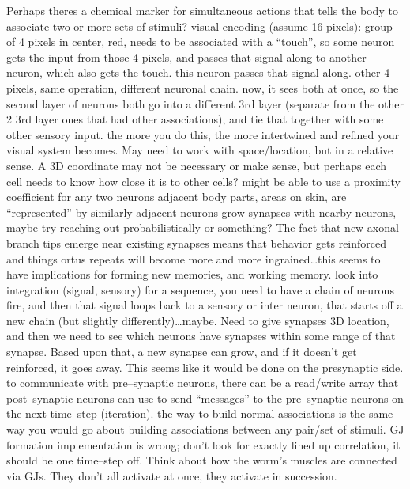 \documentclass[11pt, a4paper, oneside]{article}   	%
\begin{document}
\begin{outline}
  \point Perhaps theres a chemical marker for simultaneous actions that tells the body to associate two or more sets of stimuli?
  \point visual encoding (assume 16 pixels):
    \subpoint group of 4 pixels in center, red, needs to be associated with a ``touch'', so some neuron gets the input from those 4 pixels, and passes that signal along to another neuron, which also gets the touch. this neuron passes that signal along.
    \subpoint other 4 pixels, same operation, different neuronal chain.
    \subpoint now, it sees both at once, so the second layer of neurons both go into a different 3rd layer (separate from the other 2 3rd layer ones that had other associations), and tie that together with some other sensory input.
    \subpoint the more you do this, the more intertwined and refined your visual system becomes.
\point May need to work with space/location, but in a relative sense. A 3D coordinate may not be necessary or make sense, but perhaps each cell needs to know how close it is to other cells?
    \subpoint might be able to use a proximity coefficient for any two neurons
    \subpoint adjacent body parts, areas on skin, are ``represented'' by similarly adjacent neurons
\point grow synapses with nearby neurons, maybe try reaching out probabilistically or something?
\point The fact that new axonal branch tips emerge near existing synapses means that behavior gets reinforced and things ortus repeats will become more and more ingrained\ldots this seems to have implications for forming new memories, and working memory.
\point look into integration (signal, sensory)
\point for a sequence, you need to have a chain of neurons fire, and then that signal loops back to a sensory or inter neuron, that starts off a new chain (but slightly differently)\ldots maybe.
\point Need to give synapses 3D location, and then we need to see which neurons have synapses within some range of that synapse. 
    \subpoint Based upon that, a new synapse can grow, and if it doesn't get reinforced, it goes away. This seems like it would be done on the presynaptic side.
\point to communicate with pre--synaptic neurons, there can be a read/write array that post--synaptic neurons can use to send ``messages'' to the pre--synaptic neurons on the next time--step (iteration). 
\point the way to build normal associations is the same way you would go about building associations between any pair/set of stimuli.
\point GJ formation implementation is wrong; don't look for exactly lined up correlation, it should be one time--step off. Think about how the worm's muscles are connected via GJs. They don't all activate at once, they activate in succession.

\end{outline}
\end{document}
